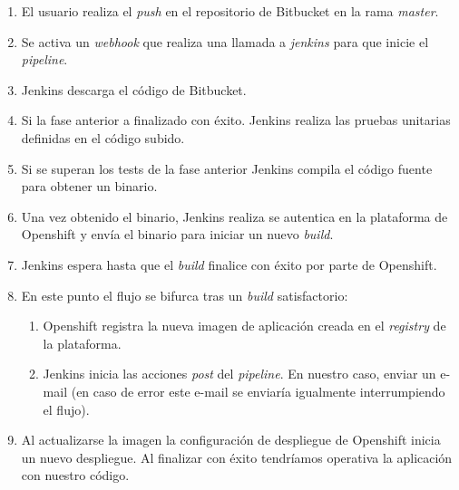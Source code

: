 \begin{enumerate}
\item El usuario realiza el \textit{push} en el repositorio de Bitbucket en la rama \textit{master}.

\item Se activa un \textit{webhook} que realiza una llamada a \textit{jenkins} para que inicie el \textit{pipeline}. 

\item Jenkins descarga el código de Bitbucket. 

\item Si la fase anterior a finalizado con éxito. Jenkins realiza las pruebas unitarias definidas en el código subido. 

\item Si se superan los tests de la fase anterior Jenkins compila el código fuente para obtener un binario.


\item Una vez obtenido el binario, Jenkins realiza se autentica en la plataforma de Openshift y envía el binario para iniciar un nuevo \textit{build}. 

\item Jenkins espera hasta que el \textit{build} finalice con éxito por parte de Openshift.

\item En este punto el flujo se bifurca tras un \textit{build} satisfactorio:  
	\begin{enumerate}
		\item Openshift registra la nueva imagen de aplicación creada en el \textit{registry} de la plataforma.

		\item Jenkins inicia las acciones \textit{post} del \textit{pipeline}. En nuestro caso, enviar un e-mail (en caso de error este e-mail se enviaría igualmente interrumpiendo el flujo). 
	\end{enumerate}

\item Al actualizarse la imagen la configuración de despliegue de Openshift inicia un nuevo despliegue. Al finalizar con éxito tendríamos operativa la aplicación con nuestro código.

\end{enumerate}



